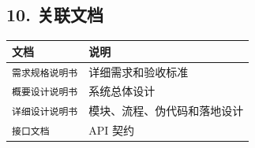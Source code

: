 \documentclass[
  a4paper,
  UTF8]{ctexart}
\begin{document}
\hypertarget{ux5173ux8054ux6587ux6863}{%
\subsection{10. 关联文档}\label{ux5173ux8054ux6587ux6863}}

\begin{longtable}[]{@{}ll@{}}
\toprule
文档 & 说明 \\
\midrule
\endhead
\texttt{需求规格说明书} & 详细需求和验收标准 \\
\texttt{概要设计说明书} & 系统总体设计 \\
\texttt{详细设计说明书} & 模块、流程、伪代码和落地设计 \\
\texttt{接口文档} & API 契约 \\
\bottomrule
\end{longtable}
\end{document}
